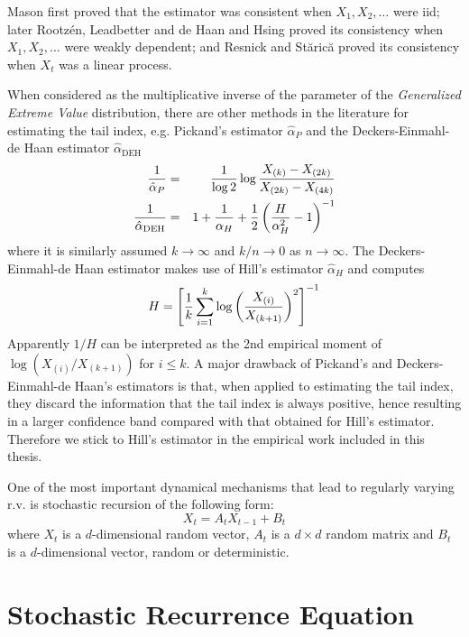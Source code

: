 Mason \cite{mason:1982} first proved that the estimator
was consistent when $X_1, X_2, \dots$ were iid; later Rootz\'en,
Leadbetter and de Haan \cite{rootzen:leadbetter:dehaan1992} and Hsing
\cite{hsing:1991} proved its consistency when $X_1, X_2, \dots$ were
weakly dependent; and Resnick and St{\u a}ric{\u a}
\cite{resnick:starica:1995, resnick:starica:1997} proved its
consistency when $X_t$ was a linear process.

When considered as the multiplicative inverse of the parameter of the
{\em Generalized Extreme Value} distribution, there are other methods
in the literature for estimating the tail index, e.g. Pickand's 
estimator \cite{pickands1975statistical} $\hat \alpha_P$ and the
Deckers-Einmahl-de Haan estimator $\hat \alpha_{\text{DEH}}$
\begin{eqnarray*}
{1 \over \hat \alpha_P}
&=&
{1 \over \log 2}
\log {
  X_{(k)} - X_{(2k)}
  \over
X_{(2k)} - X_{(4k)}  
} \\
{1 \over \hat \alpha_{\text{DEH}}}
&=&
1 + {1 \over \alpha_H} + {1 \over 2} \left(
  {H \over \alpha_H^2} - 1
\right)^{-1}
\end{eqnarray*}
where it is similarly assumed $k \to \infty$ and $k/n \to 0$ as $n \to
\infty$. The Deckers-Einmahl-de Haan estimator makes use of Hill's
estimator $\hat \alpha_H$ and computes
\[
H = \left[
  {1 \over k} \sum_{i=1}^k \log \left(
    { X_{(i)} \over X_{(k+1)} }
  \right)^2
\right]^{-1}
\]
Apparently $1/H$ can be interpreted as the 2nd empirical moment of
$\log(X_{(i)}/X_{(k+1)})$ for $i \leq k$.
A major drawback of Pickand's and Deckers-Einmahl-de Haan's estimators
is that, when applied to estimating the tail index, they discard the
information that the tail index is always positive, hence resulting in
a larger confidence band compared with that obtained for Hill's
estimator. Therefore we stick to Hill's estimator in the empirical
work included in this thesis.

One of the most important dynamical mechanisms that lead to regularly
varying r.v. is stochastic recursion of the following form:
\[
X_t = A_t X_{t-1} + B_t
\]
where $X_t$ is a $d$-dimensional random vector, $A_t$ is a $d\times d$
random matrix and $B_t$ is a $d$-dimensional vector, random or
deterministic.

\section{Stochastic Recurrence Equation}



